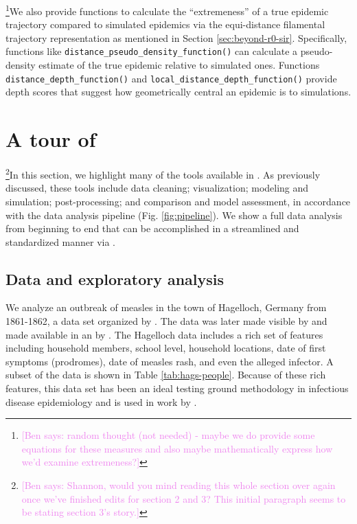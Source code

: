 \documentclass[
  shortnames]{jss}
\begin{document}
\footnote{\textcolor{violet}{[Ben says: random thought (not needed) - maybe we do provide some equations for these measures and also maybe mathematically express how we'd examine extremeness?]}}We
also provide functions to calculate the ``extremeness'' of a true
epidemic trajectory compared to simulated epidemics via the
equi-distance filamental trajectory representation as mentioned in
Section \ref{sec:beyond-r0-sir}. Specifically, functions like
\texttt{distance\_pseudo\_density\_function()} can calculate a
pseudo-density estimate of the true epidemic relative to simulated ones.
Functions \texttt{distance\_depth\_function()} and
\texttt{local\_distance\_depth\_function()} provide depth scores that
suggest how geometrically central an epidemic is to simulations.

\section[Tour]{A tour of }\label{sec:tour}

\footnote{\textcolor{violet}{[Ben says: Shannon, would you mind reading this whole section over again once we've finished edits for section 2 and 3? This initial paragraph seems to be stating section 3's story.]}}In
this section, we highlight many of the tools available in
. As previously discussed, these tools include data
cleaning; visualization; modeling and simulation; post-processing; and
comparison and model assessment, in accordance with the data analysis
pipeline (Fig. \ref{fig:pipeline}). We show a full data analysis from
beginning to end that can be accomplished in a streamlined and
standardized manner via .

\subsection{Data and exploratory analysis}

We analyze an outbreak of measles in the town of Hagelloch, Germany from
1861-1862, a data set organized by \cite{pfeilsticker1863}. The data was
later made visible by \cite{oesterle1992} and made available in an
 by \cite{surveillance2017}. The Hagelloch data includes a
rich set of features including household members, school level,
household locations, date of first symptoms (prodromes), date of measles
rash, and even the alleged infector. A subset of the data is shown in
Table \ref{tab:hags-people}. Because of these rich features, this data
set has been an ideal testing ground methodology in infectious disease
epidemiology and is used in work by
\cite{Neal2004,britton2011,groendyke2012,becker2016}.
\end{document}
